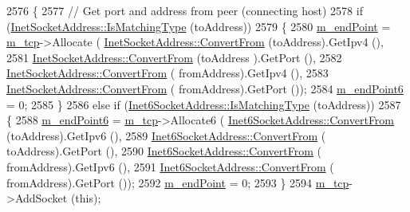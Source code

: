 \begin{DoxyCode}
2576 \{
2577   \textcolor{comment}{// Get port and address from peer (connecting host)}
2578   \textcolor{keywordflow}{if} (\hyperlink{classns3_1_1InetSocketAddress_a9426766e34e928ce5dbdbeb9563a10df}{InetSocketAddress::IsMatchingType} (toAddress))
2579     \{
2580       \hyperlink{classns3_1_1TcpSocketBase_a78a4181c0a7394749110ea6b194de467}{m\_endPoint} = \hyperlink{classns3_1_1TcpSocketBase_a26b979e55b02e0aed76cb84c39a66bc7}{m\_tcp}->Allocate (
      \hyperlink{classns3_1_1InetSocketAddress_ade776b1109e7b9a7be0b22ced49931e3}{InetSocketAddress::ConvertFrom} (toAddress).GetIpv4 (),
2581                                     \hyperlink{classns3_1_1InetSocketAddress_ade776b1109e7b9a7be0b22ced49931e3}{InetSocketAddress::ConvertFrom} (toAddress
      ).GetPort (),
2582                                     \hyperlink{classns3_1_1InetSocketAddress_ade776b1109e7b9a7be0b22ced49931e3}{InetSocketAddress::ConvertFrom} (
      fromAddress).GetIpv4 (),
2583                                     \hyperlink{classns3_1_1InetSocketAddress_ade776b1109e7b9a7be0b22ced49931e3}{InetSocketAddress::ConvertFrom} (
      fromAddress).GetPort ());
2584       \hyperlink{classns3_1_1TcpSocketBase_ab4b114c3959ee672b4fc9b7a90540dba}{m\_endPoint6} = 0;
2585     \}
2586   \textcolor{keywordflow}{else} \textcolor{keywordflow}{if} (\hyperlink{classns3_1_1Inet6SocketAddress_a4d928c54affbfb530a12076d6d7e0540}{Inet6SocketAddress::IsMatchingType} (toAddress))
2587     \{
2588       \hyperlink{classns3_1_1TcpSocketBase_ab4b114c3959ee672b4fc9b7a90540dba}{m\_endPoint6} = \hyperlink{classns3_1_1TcpSocketBase_a26b979e55b02e0aed76cb84c39a66bc7}{m\_tcp}->Allocate6 (
      \hyperlink{classns3_1_1Inet6SocketAddress_a2177c66e1bcf17c85dcffb9d2a971f5a}{Inet6SocketAddress::ConvertFrom} (toAddress).GetIpv6 (),
2589                                       \hyperlink{classns3_1_1Inet6SocketAddress_a2177c66e1bcf17c85dcffb9d2a971f5a}{Inet6SocketAddress::ConvertFrom} (
      toAddress).GetPort (),
2590                                       \hyperlink{classns3_1_1Inet6SocketAddress_a2177c66e1bcf17c85dcffb9d2a971f5a}{Inet6SocketAddress::ConvertFrom} (
      fromAddress).GetIpv6 (),
2591                                       \hyperlink{classns3_1_1Inet6SocketAddress_a2177c66e1bcf17c85dcffb9d2a971f5a}{Inet6SocketAddress::ConvertFrom} (
      fromAddress).GetPort ());
2592       \hyperlink{classns3_1_1TcpSocketBase_a78a4181c0a7394749110ea6b194de467}{m\_endPoint} = 0;
2593     \}
2594   \hyperlink{classns3_1_1TcpSocketBase_a26b979e55b02e0aed76cb84c39a66bc7}{m\_tcp}->AddSocket (\textcolor{keyword}{this});

\end{DoxyCode}
